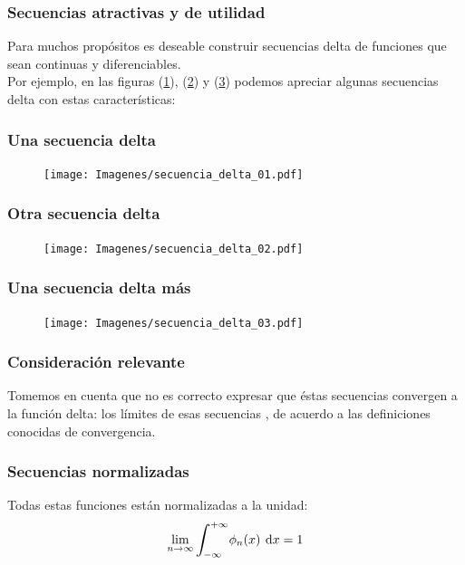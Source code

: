 \documentclass[12pt]{beamer}
\begin{document}
\begin{frame}
\frametitle{Secuencias atractivas y de utilidad}
Para muchos propósitos es deseable construir secuencias delta de funciones que sean continuas y diferenciables.
\\
\bigskip
\pause 
Por ejemplo, en las figuras (\ref{fig:plot_secuencia_01}), (\ref{fig:plot_secuencia_02}) y (\ref{fig:plot_secuencia_03}) podemos apreciar algunas secuencias delta con estas características:
\end{frame}

\begin{frame}
\frametitle{Una secuencia delta}
\begin{figure}[H]
    \centering
    \texttt{[image: Imagenes/secuencia\_delta\_01.pdf]}
    \label{fig:plot_secuencia_01}
\end{figure}
\end{frame}

\begin{frame}
\frametitle{Otra secuencia delta}
\begin{figure}[H]
    \centering
    \texttt{[image: Imagenes/secuencia\_delta\_02.pdf]}
    \label{fig:plot_secuencia_02}
\end{figure}
\end{frame}

\begin{frame}
\frametitle{Una secuencia delta más}
\begin{figure}[H]
    \centering
    \texttt{[image: Imagenes/secuencia\_delta\_03.pdf]}
    \label{fig:plot_secuencia_03}
\end{figure}
\end{frame}

\begin{frame}
\frametitle{Consideración relevante}
Tomemos en cuenta que no es correcto expresar que éstas secuencias convergen a la función delta: \pause los límites de esas secuencias , de acuerdo a las definiciones conocidas de convergencia.
\end{frame}

\begin{frame}
\frametitle{Secuencias normalizadas}
Todas estas funciones están normalizadas a la unidad:
\pause
\begin{equation}
\lim_{n \to \infty} \scaleint{6ex}_{\bs - \infty}^{+ \infty} \phi_{n} (x) \: \dd{x} = 1
\label{eq:ecuacion_delta_05}
\end{equation}
\end{frame}
\end{document}
